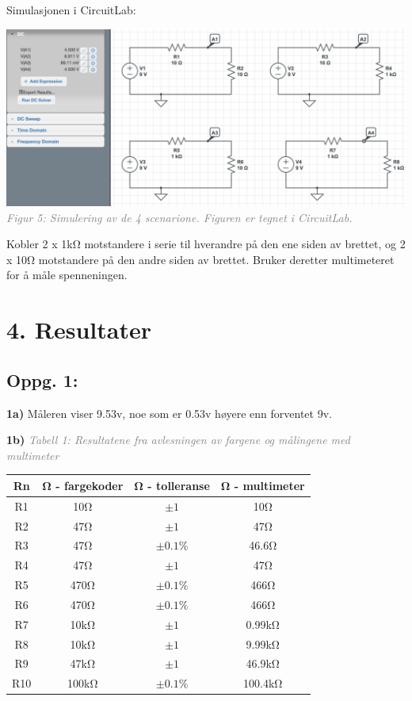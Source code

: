 \documentclass{article}
\begin{document}
            \pagebreak
            Simulasjonen i CircuitLab:
            \begin{center}
                \includegraphics[scale=0.35]{vedlegg/4.png}\linebreak
                \textit{\textcolor{gray}{Figur 5: Simulering av de 4 scenarione. Figuren er tegnet i CircuitLab.}}
            \end{center}

            Kobler 2 x 1kΩ motstandere i serie til hverandre på den ene siden av brettet, og 2 x 10Ω motstandere 
            på den andre siden av brettet. Bruker deretter multimeteret for å måle spenneningen.

    \section*{4. Resultater}
        \subsection*{Oppg. 1:}
        \textbf{1a)} 
        Måleren viser 9.53v, noe som er 0.53v høyere enn forventet 9v. \linebreak

        \textbf{1b)}
        \textit{\textcolor{gray}{Tabell 1: Resultatene fra avlesningen av fargene og målingene med multimeter}}\linebreak
        \begin{center}
            \begin{tabular}{ c|c|c|c } 
             Rn & Ω - fargekoder & Ω - tolleranse & Ω - multimeter \\ 
             \hline
             R1 & 10Ω & \(\pm 1\) & 10Ω\\
             R2 & 47Ω & \(\pm 1\) & 47Ω \\
             R3 & 47Ω & \(\pm 0.1\% \) & 46.6Ω\\
             R4 & 47Ω & \(\pm 1\) & 47Ω \\
             R5 & 470Ω & \(\pm 0.1\% \) & 466Ω \\
             R6 & 470Ω & \(\pm 0.1\% \) & 466Ω \\
             R7 & 10kΩ & \(\pm 1\) & 0.99kΩ \\
             R8 & 10kΩ & \(\pm 1\) & 9.99kΩ \\
             R9 & 47kΩ & \(\pm 1\) & 46.9kΩ \\
             R10 & 100kΩ & \(\pm 0.1\% \) & 100.4kΩ
            \end{tabular}
        \end{center}
    
\end{document}

